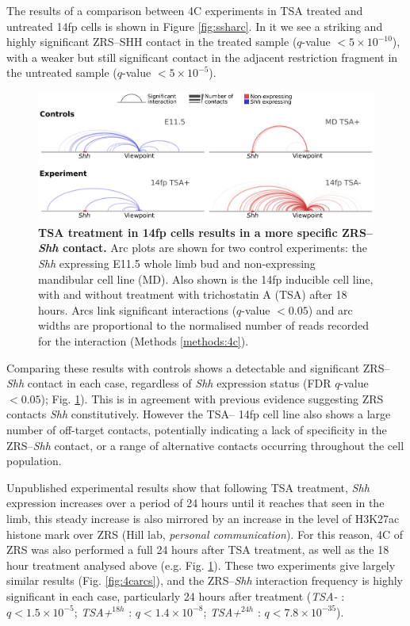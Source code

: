 \documentclass[a4paper,11pt,oneside]{book}
\begin{document}
The results of a comparison between 4C experiments in TSA treated and untreated 14fp cells is shown in Figure \ref{fig:ssharc}. In it we see a striking and highly significant ZRS--SHH contact in the treated sample ($q$-value $ < 5 \times 10^{-10}$), with a weaker but still significant contact in the adjacent restriction fragment in the untreated sample ($q$-value $ < 5 \times 10^{-5}$). 

\begin{figure}
\begin{center} 
\includegraphics[width=5.5in]{4c_4way.pdf}
\captionsetup{width=\textwidth} 
\caption[ TSA treatment in 14fp cells results in a more specific ZRS--\emph{Shh} contact. ]{ {\bf TSA treatment in 14fp cells results in a more specific ZRS--\emph{Shh} contact. }
Arc plots are shown for two control experiments: the \emph{Shh} expressing E11.5 whole limb bud and non-expressing mandibular cell line (MD). Also shown is the 14fp inducible cell line, with and without treatment with trichostatin A (TSA) after 18 hours. Arcs link significant interactions ($q$-value $< 0.05$) and arc widths are proportional to the normalised number of reads recorded for the interaction (Methods \ref{methods:4c}).
}\label{fig:4c4way}
\end{center} 
\end{figure} 

Comparing these results with controls shows a detectable and significant ZRS--\emph{Shh} contact in each case, regardless of \emph{Shh} expression status (FDR $q$-value $ < 0.05$); Fig. \ref{fig:4c4way}). This is in agreement with previous evidence suggesting ZRS contacts \emph{Shh} constitutively.\cite{Bouwman2015a} However the TSA-- 14fp cell line also shows a large number of off-target contacts, potentially indicating a lack of specificity in the ZRS--\emph{Shh} contact, or a range of alternative contacts occurring throughout the cell population.

Unpublished experimental results show that following TSA treatment, \emph{Shh} expression increases over a period of 24 hours until it reaches that seen in the limb, this steady increase is also mirrored by an increase in the level of H3K27ac histone mark over ZRS (Hill lab, \emph{personal communication}). For this reason, 4C of ZRS was also performed a full 24 hours after TSA treatment, as well as the 18 hour treatment analysed above (e.g. Fig. \ref{fig:4c4way}). These two experiments give largely similar results (Fig. \ref{fig:4carcs}), and the ZRS--\emph{Shh} interaction frequency is highly significant in each case, particularly 24 hours after treatment (\emph{TSA-} : $ q < 1.5 \times 10^{-5}$; \emph{TSA+}$^{18h}$ : $q < 1.4 \times 10^{-8}$; \emph{TSA+}$^{24h}$ : $ q < 7.8 \times 10^{-35}$).
\end{document}
